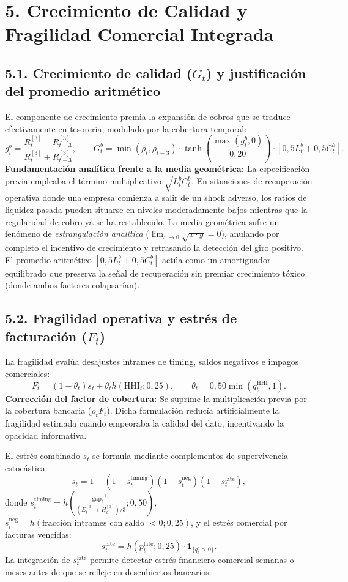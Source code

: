 \documentclass[10pt,a4paper]{article}
\begin{document}
\section*{5. Crecimiento de Calidad y Fragilidad Comercial Integrada}

\subsection*{5.1. Crecimiento de calidad ($G_t$) y justificación del promedio aritmético}
El componente de crecimiento premia la expansión de cobros que se traduce efectivamente en tesorería, modulado por la cobertura temporal:
\[
g_t^b = \frac{R_t^{[3]} - R_{t-3}^{[3]}}{R_t^{[3]} + R_{t-3}^{[3]}}, \qquad G_t^b = \min(\rho_t, \rho_{t-3}) \cdot \tanh\left(\frac{\max(g_t^b, 0)}{0{,}20}\right) \cdot \left[0{,}5 L_t^b + 0{,}5 C_t^b\right].
\]
\textbf{Fundamentación analítica frente a la media geométrica:} La especificación previa empleaba el término multiplicativo $\sqrt{L_t^b C_t^b}$. En situaciones de recuperación operativa donde una empresa comienza a salir de un shock adverso, los ratios de liquidez pasada pueden situarse en niveles moderadamente bajos mientras que la regularidad de cobro ya se ha restablecido. La media geométrica sufre un fenómeno de \emph{estrangulación analítica} ($\lim_{x \to 0} \sqrt{x \cdot y} = 0$), anulando por completo el incentivo de crecimiento y retrasando la detección del giro positivo. El promedio aritmético $[0{,}5 L_t^b + 0{,}5 C_t^b]$ actúa como un amortiguador equilibrado que preserva la señal de recuperación sin premiar crecimiento tóxico (donde ambos factores colapsarían).

\subsection*{5.2. Fragilidad operativa y estrés de facturación ($F_t$)}
La fragilidad evalúa desajustes intrames de timing, saldos negativos e impagos comerciales:
\[
F_t = (1 - \theta_t) s_t + \theta_t h(\text{HHI}_t; 0{,}25), \qquad \theta_t = 0{,}50 \min(q_t^{\mathrm{HHI}}, 1).
\]
\textbf{Corrección del factor de cobertura:} Se suprime la multiplicación previa por la cobertura bancaria ($\rho_t F_t$). Dicha formulación reducía artificialmente la fragilidad estimada cuando empeoraba la calidad del dato, incentivando la opacidad informativa. 

El estrés combinado $s_t$ se formula mediante complementos de supervivencia estocástica:
\[
s_t = 1 - (1 - s_t^{\mathrm{timing}})(1 - s_t^{\mathrm{neg}})(1 - s_t^{\mathrm{late}}),
\]
donde $s_t^{\mathrm{timing}} = h\left(\frac{\overline{\mathrm{gap}}_t^{[3]}}{(E_t^{[3]}+H_t^{[3]})/3}; 0{,}50\right)$, $s_t^{\mathrm{neg}} = h(\text{fracción intrames con saldo } < 0; 0{,}25)$, y el estrés comercial por facturas vencidas:
\[
s_t^{\mathrm{late}} = h(p_t^{\mathrm{late}}; 0{,}25) \cdot \mathbf{1}_{\{q_t^e > 0\}}.
\]
La integración de $s_t^{\mathrm{late}}$ permite detectar estrés financiero comercial semanas o meses antes de que se refleje en descubiertos bancarios.
\end{document}
